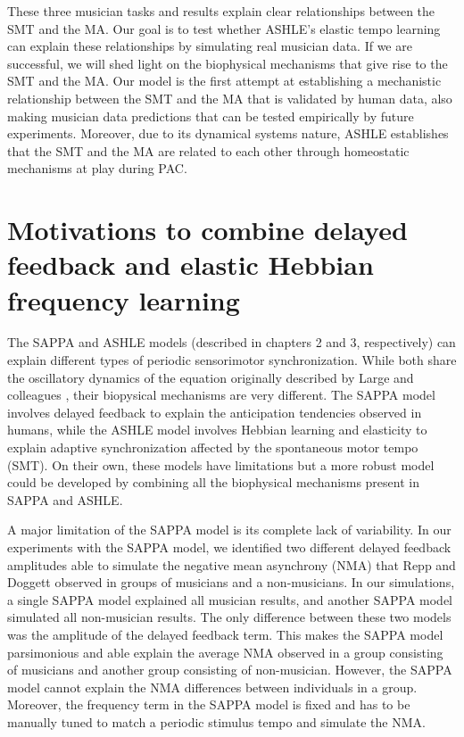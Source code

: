 \documentclass{report}
\begin{document}
These three musician tasks and results explain clear relationships between the SMT and the MA. Our goal is to test whether ASHLE's elastic tempo learning can explain these relationships by simulating real musician data. If we are successful, we will shed light on the biophysical mechanisms that give rise to the SMT and the MA. Our model is the first attempt at establishing a mechanistic relationship between the SMT and the MA that is validated by human data, also making musician data predictions that can be tested empirically by future experiments. Moreover, due to its dynamical systems nature, ASHLE establishes that the SMT and the MA are related to each other through homeostatic mechanisms at play during PAC.



\chapter{Motivations to combine delayed feedback and elastic Hebbian frequency learning}

The SAPPA and ASHLE models (described in chapters 2 and 3, respectively) can explain different types of periodic sensorimotor synchronization. While both share the oscillatory dynamics of the equation originally described by Large and colleagues \cite{large2010canonical}, their biopysical mechanisms are very different. The SAPPA model involves delayed feedback to explain the anticipation tendencies observed in humans, while the ASHLE model involves Hebbian learning and elasticity to explain adaptive synchronization affected by the spontaneous motor tempo (SMT). On their own, these models have limitations but a more robust model could be developed by combining all the biophysical mechanisms present in SAPPA and ASHLE.

A major limitation of the SAPPA model is its complete lack of variability. In our experiments with the SAPPA model, we identified two different delayed feedback amplitudes able to simulate the negative mean asynchrony (NMA) that Repp and Doggett \cite{repp2007tapping} observed in groups of musicians and a non-musicians. In our simulations, a single SAPPA model explained all musician results, and another SAPPA model simulated all non-musician results. The only difference between these two models was the amplitude of the delayed feedback term. This makes the SAPPA model parsimonious and able explain the average NMA observed in a group consisting of musicians and another group consisting of non-musician. However, the SAPPA model cannot explain the NMA differences between individuals in a group. Moreover, the frequency term in the SAPPA model is fixed and has to be manually tuned to match a periodic stimulus tempo and simulate the NMA. 
\end{document}
